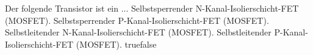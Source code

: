     {Der folgende Transistor ist ein ...}
    {Selbstsperrender N-Kanal-Isolierschicht-FET (MOSFET).}
    {Selbstsperrender P-Kanal-Isolierschicht-FET (MOSFET).}
    {Selbstleitender N-Kanal-Isolierschicht-FET (MOSFET).}
    {Selbstleitender P-Kanal-Isolierschicht-FET (MOSFET).}
    {true}{false}